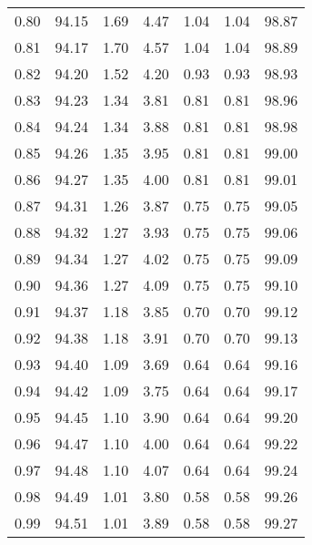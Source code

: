 \begin{tabular}{|c|c|c|c|c|c|c|}
      0.80 &     94.15 &      1.69 &       4.47 &    1.04 &       1.04 &         98.87 \\
      0.81 &     94.17 &      1.70 &       4.57 &    1.04 &       1.04 &         98.89 \\
      0.82 &     94.20 &      1.52 &       4.20 &    0.93 &       0.93 &         98.93 \\
      0.83 &     94.23 &      1.34 &       3.81 &    0.81 &       0.81 &         98.96 \\
      0.84 &     94.24 &      1.34 &       3.88 &    0.81 &       0.81 &         98.98 \\
      0.85 &     94.26 &      1.35 &       3.95 &    0.81 &       0.81 &         99.00 \\
      0.86 &     94.27 &      1.35 &       4.00 &    0.81 &       0.81 &         99.01 \\
      0.87 &     94.31 &      1.26 &       3.87 &    0.75 &       0.75 &         99.05 \\
      0.88 &     94.32 &      1.27 &       3.93 &    0.75 &       0.75 &         99.06 \\
      0.89 &     94.34 &      1.27 &       4.02 &    0.75 &       0.75 &         99.09 \\
      0.90 &     94.36 &      1.27 &       4.09 &    0.75 &       0.75 &         99.10 \\
      0.91 &     94.37 &      1.18 &       3.85 &    0.70 &       0.70 &         99.12 \\
      0.92 &     94.38 &      1.18 &       3.91 &    0.70 &       0.70 &         99.13 \\
      0.93 &     94.40 &      1.09 &       3.69 &    0.64 &       0.64 &         99.16 \\
      0.94 &     94.42 &      1.09 &       3.75 &    0.64 &       0.64 &         99.17 \\
      0.95 &     94.45 &      1.10 &       3.90 &    0.64 &       0.64 &         99.20 \\
      0.96 &     94.47 &      1.10 &       4.00 &    0.64 &       0.64 &         99.22 \\
      0.97 &     94.48 &      1.10 &       4.07 &    0.64 &       0.64 &         99.24 \\
      0.98 &     94.49 &      1.01 &       3.80 &    0.58 &       0.58 &         99.26 \\
      0.99 &     94.51 &      1.01 &       3.89 &    0.58 &       0.58 &         99.27 \\
\bottomrule
\end{tabular}
